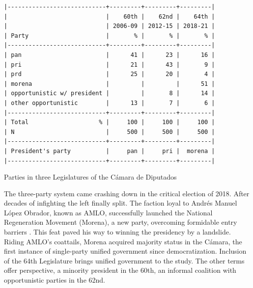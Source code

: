\documentclass[letter,12pt]{article}
\begin{document}
\begin{table}
\begin{scriptsize}
\begin{verbatim}
|----------------------------+---------+---------+---------|
|                            |    60th |    62nd |    64th |
|                            | 2006-09 | 2012-15 | 2018-21 |
| Party                      |       % |       % |       % |
|----------------------------+---------+---------+---------|
| pan                        |      41 |      23 |      16 |
| pri                        |      21 |      43 |       9 |
| prd                        |      25 |      20 |       4 |
| morena                     |         |         |      51 |
| opportunistic w/ president |         |       8 |      14 |
| other opportunistic        |      13 |       7 |       6 |
|----------------------------+---------+---------+---------|
| Total                    % |     100 |     100 |     100 |
| N                          |     500 |     500 |     500 |
|----------------------------+---------+---------+---------|
| President's party          |     pan |     pri |  morena |
|----------------------------+---------+---------+---------|
\end{verbatim}
\end{scriptsize}
\caption{Parties in three Legislatures of the Cámara de Diputados}\label{T:seats}
\end{table}


The three-party system came crashing down in the critical election of 2018. After decades of infighting the left finally split. The faction loyal to Andrés Manuel López Obrador, known as AMLO, successfully launched the National Regeneration Movement (Morena), a new party, overcoming formidable entry barriers \citep{magar.2007ref.2015}. This feat paved his way to winning the presidency by a landslide. Riding AMLO's coattails, Morena acquired majority status in the Cámara, the first instance of single-party unified government since democratization. Inclusion of the 64th Legislature brings unified government to the study. The other terms offer perspective, a minority president in the 60th, an informal coalition with opportunistic parties in the 62nd. 
\end{document}
